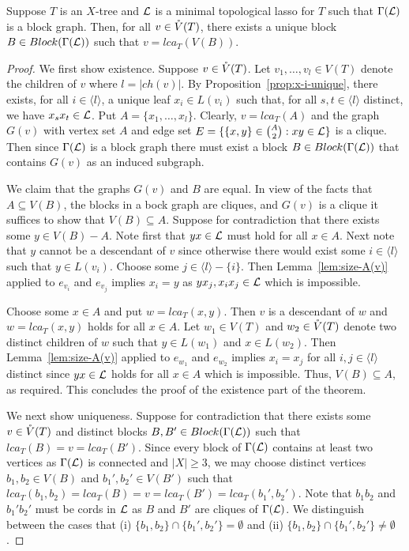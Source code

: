 \begin{thm}\label{theo:unique-block}
Suppose $T$ is an $X$-tree and ${\mathcal L}$ is a minimal topological lasso for
$T$ such that $\Gamma({\mathcal L})$ is a block graph. Then, for all $v\in \mathring{V}(T)$,
there exists a unique block $B\in Block(\Gamma({\mathcal L}))$ such that
$v=lca_T(V(B))$.
\end{thm}
\begin{proof}
We first show existence. Suppose $v\in \mathring{V}(T)$. Let
$v_1,\ldots,v_l\in V(T)$ denote the children of $v$  where $l=|ch(v)|$.
By Proposition~\ref{prop:x-i-unique}, there exists, for 
all $i\in\langle l\rangle$, a unique
leaf $x_i\in L(v_i)$ such that, for all  $s,t\in \langle l\rangle$ distinct,
we have $x_sx_t\in {\mathcal L}$. Put $A=\{x_1,\ldots,x_l\}$.
Clearly, $v=lca_T(A)$ and the graph $G(v)$ with vertex set $A$ and
edge set $E=\{\{x,y\}\in {A\choose 2}: xy\in{\mathcal L}\}$ is a clique.
Then since $\Gamma({\mathcal L})$ is a block graph
there must exist a block $B\in Block(\Gamma({\mathcal L}))$ that contains
$G(v)$ as an induced subgraph.

We claim that the graphs $G(v)$ and $B$  are equal. 
In view of the facts that $A\subseteq V(B)$, the
 blocks in a bock graph are cliques, and $G(v)$
is a clique it suffices to show that
$V(B)\subseteq A$. Suppose for contradiction that
there exists some $y\in V(B)-A$. Note first that $yx\in {\mathcal L}$
must hold for all $x\in A$.
Next note that $y$ cannot be a descendant of $v$
since otherwise there would exist some $i\in\langle l\rangle$ such 
that $y\in L(v_i)$. Choose some  $j\in \langle l\rangle-\{i\}$. Then
Lemma~\ref{lem:size-A(v)} applied to $e_{v_i}$ and $e_{v_j}$
 implies $x_i=y$  as $yx_j,x_ix_j\in{\mathcal L}$
 which is impossible.

Choose some $x\in A$ and put 
$w=lca_T(x,y)$. Then $v$ is a descendant of $w$ and $w=lca_T(x,y)$ 
holds for all $x\in A$. Let $w_1\in V(T)$ and $w_2\in \mathring{V}(T)$ 
denote two distinct children of $w$ such that $y\in L(w_1)$ 
and $x\in L(w_2)$. Then Lemma~\ref{lem:size-A(v)} applied 
to $e_{w_1}$ and $e_{w_2}$
implies $x_i=x_j$ for all $i,j\in\langle l\rangle$ distinct
since $yx\in{\mathcal L}$ holds
for all $x\in A$ which is impossible.
Thus, $V(B)\subseteq A$, as required. This concludes the proof of
the existence part of the theorem.

We next show uniqueness. 
Suppose for contradiction that there exists
some $v\in \mathring{V}(T)$ and distinct blocks $B,B'\in Block(\Gamma({\mathcal L}))$
such that  $lca_T(B)=v=lca_T(B')$. 
Since every block of $\Gamma({\mathcal L})$ contains at least two vertices
as $\Gamma({\mathcal L})$ is connected and $|X|\geq 3$,
we may choose distinct vertices  $b_1,b_2\in V(B)$ and 
$b_1',b_2'\in V(B')$ such that 
$lca_T(b_1,b_2)=lca_T(B)=v=lca_T(B')=lca_T(b_1',b_2')$. 
Note that $b_1b_2$ and  $b_1'b_2' $ must be cords in ${\mathcal L}$
as $B$ and $B'$ are cliques of $\Gamma({\mathcal L})$. 
We distinguish between the
cases that (i) $\{b_1,b_2\}\cap\{b_1',b_2'\}=\emptyset $
and (ii) $\{b_1,b_2\}\cap\{b_1',b_2'\}\not=\emptyset $.


\end{proof}
